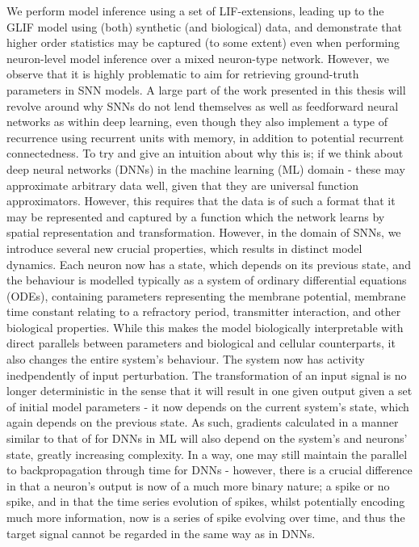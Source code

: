 \documentclass[mphil,deptreport,ai]{infthesis} %
\begin{document}
We perform model inference using a set of LIF-extensions, leading up to the GLIF model using (both) synthetic (and biological) data, and demonstrate that higher order statistics may be captured (to some extent) even when performing neuron-level model inference over a mixed neuron-type network.
However, we observe that it is highly problematic to aim for retrieving ground-truth parameters in SNN models. A large part of the work presented in this thesis will revolve around why SNNs do not lend themselves as well as feedforward neural networks as within deep learning, even though they also implement a type of recurrence using recurrent units with memory, in addition to potential recurrent connectedness.
To try and give an intuition about why this is; if we think about deep neural networks (DNNs) in the machine learning (ML) domain - these may approximate arbitrary data well, given that they are universal function approximators. However, this requires that the data is of such a format that it may be represented and captured by a function which the network learns by spatial representation and transformation.
However, in the domain of SNNs, we introduce several new crucial properties, which results in distinct model dynamics. Each neuron now has a state, which depends on its previous state, and the behaviour is modelled typically as a system of ordinary differential equations (ODEs), containing parameters representing the membrane potential, membrane time constant relating to a refractory period, transmitter interaction, and other biological properties. 
While this makes the model biologically interpretable with direct parallels between parameters and biological and cellular counterparts, it also changes the entire system's behaviour.
The system now has activity inedpendently of input perturbation. The transformation of an input signal is no longer deterministic in the sense that it will result in one given output given a set of initial model parameters - it now depends on the current system's state, which again depends on the previous state.
As such, gradients calculated in a manner similar to that of for DNNs in ML will also depend on the system's and neurons' state, greatly increasing complexity.
In a way, one may still maintain the parallel to backpropagation through time for DNNs - however, there is a crucial difference in that a neuron's output is now of a much more binary nature; a spike or no spike, and in that the time series evolution of spikes, whilst potentially encoding much more information, now is a series of spike evolving over time, and thus the target signal cannot be regarded in the same way as in DNNs.
\end{document}

